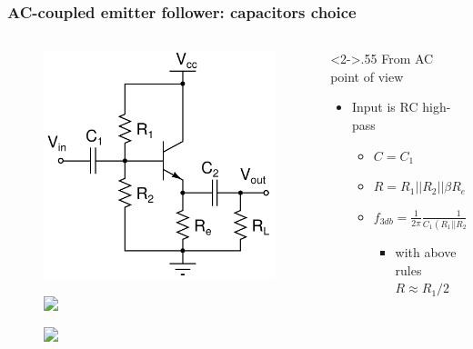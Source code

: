 \documentclass[beamer]{standalone}
\begin{document}
\frame
{ \frametitle{AC-coupled emitter follower: capacitors choice}
\begin{columns}[t]
 \begin{column}{.45\textwidth}
  \vskip -0.4in
  \begin{figure}
   \includegraphics[height=0.40\textheight]{./schematics/npn_ac_emitter_follower}
  \end{figure}
  \vskip -0.3in
  \begin{figure}
   \includegraphics<2->[height=0.20\textheight]{./schematics/ac_coupled_input}
  \end{figure}
  \vskip -0.3in
  \begin{figure}
   \includegraphics<3->[height=0.20\textheight]{./schematics/ac_coupled_output}
  \end{figure}
 \end{column}
 \begin{column}<2->{.55\textwidth}
  From AC point of view
  \begin{itemize}
   \item<2-> Input is RC high-pass
    \begin{itemize}
     \item $C=C_1$
     \item $R=R_1||R_2||\beta R_e$
     \item $f_{3db}=\frac{1}{2 \pi} \frac{1}{C_1 (R_1||R_2||\beta R_e)}$
      \begin{itemize}
       \item with above rules $R \approx R_1/2$

\end{itemize}
\end{itemize}
\end{itemize}
\end{column}
\end{columns}}
\end{document}

